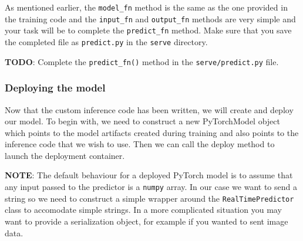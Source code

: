 \documentclass[11pt]{article}
\begin{document}
    As mentioned earlier, the \texttt{model\_fn} method is the same as the
one provided in the training code and the \texttt{input\_fn} and
\texttt{output\_fn} methods are very simple and your task will be to
complete the \texttt{predict\_fn} method. Make sure that you save the
completed file as \texttt{predict.py} in the \texttt{serve} directory.

\textbf{TODO}: Complete the \texttt{predict\_fn()} method in the
\texttt{serve/predict.py} file.

    \hypertarget{deploying-the-model}{%
\subsubsection{Deploying the model}\label{deploying-the-model}}

Now that the custom inference code has been written, we will create and
deploy our model. To begin with, we need to construct a new PyTorchModel
object which points to the model artifacts created during training and
also points to the inference code that we wish to use. Then we can call
the deploy method to launch the deployment container.

\textbf{NOTE}: The default behaviour for a deployed PyTorch model is to
assume that any input passed to the predictor is a \texttt{numpy} array.
In our case we want to send a string so we need to construct a simple
wrapper around the \texttt{RealTimePredictor} class to accomodate simple
strings. In a more complicated situation you may want to provide a
serialization object, for example if you wanted to sent image data.
\end{document}
